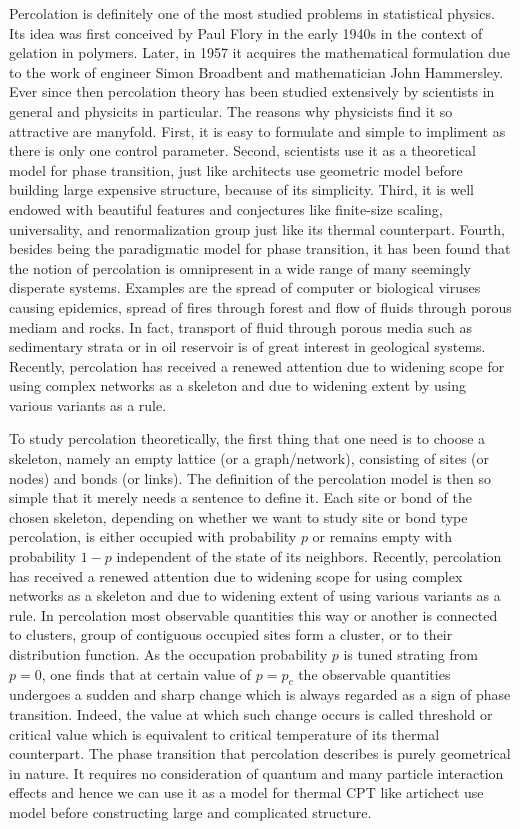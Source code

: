 \documentclass[twocolumn,showpacs,preprintnumbers,amsmath,amssymb]{article}
\begin{document}
Percolation is definitely one of the most studied problems in statistical physics. Its idea was first conceived
by Paul Flory in the early 1940s in the context of gelation in polymers. Later, in 1957 it acquires the mathematical 
formulation due to the work of engineer Simon Broadbent and mathematician John Hammersley. Ever since then
percolation theory has been studied extensively by scientists in general
and physicits in particular. The reasons why
physicists find it so attractive are manyfold. First, it is easy
to formulate and simple to impliment as there is only one control parameter. Second, scientists use it as a theoretical model
for phase transition, just like
architects use geometric model before building large expensive
structure, because of its simplicity. Third, it is well endowed with beautiful features and 
conjectures like finite-size scaling, universality, and renormalization group just like its thermal counterpart.
Fourth, besides being the paradigmatic model for phase transition, it has been found that the notion of percolation is omnipresent in a wide 
range of many seemingly disperate systems. Examples are the spread of computer or biological viruses causing epidemics, spread of fires through forest and flow of fluids through porous mediam and rocks.
In fact, transport of fluid through porous media such as sedimentary strata or in oil reservoir is of 
great interest in geological systems. Recently, percolation has received a renewed attention 
due to widening scope for using complex networks as a skeleton and due to widening extent by using 
various variants as a rule. 

To study percolation theoretically, the first thing that one need is to choose a skeleton, 
namely an empty lattice (or a graph/network), consisting of sites (or nodes) and bonds (or links).
The definition of the percolation model is then so simple that it merely needs a sentence
to define it. 
Each site or bond of the chosen skeleton, depending on whether we want to study site or bond type percolation,
is either occupied with probability $p$ or remains empty with probability $1-p$ 
independent of the state of its neighbors. Recently, percolation has received a renewed attention 
due to widening scope for using complex networks as a skeleton and due to widening extent of using 
various variants as a rule. 
In percolation most observable quantities
this way or another is connected to clusters, group of contiguous occupied sites form a cluster, or to 
their distribution function. As 
the occupation probability $p$ is tuned strating from $p=0$, one finds that at certain value of $p=p_c$ the observable
quantities undergoes a sudden and sharp change which is always regarded as a sign
of phase transition. Indeed, the value at which such change occurs
is called threshold or critical value which is equivalent to critical temperature of its thermal counterpart. 
The phase transition that percolation describes is purely geometrical in nature. It requires 
no consideration of quantum and many particle interaction effects and hence we can use it as a model for 
thermal CPT like artichect use model before constructing large and complicated structure.
\end{document}
